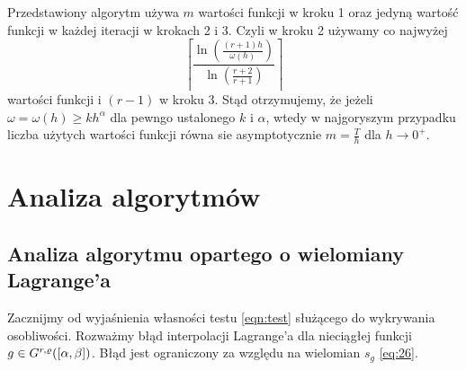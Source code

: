 \documentclass[oik, pdftex, robocza, man]{mgrwms}
\begin{document}
    Przedstawiony algorytm używa $m$ wartości funkcji w kroku 1 oraz jedyną wartość funkcji w każdej iteracji w krokach 2 i 3. Czyli w kroku 2 używamy co najwyżej
    \begin{equation*}
        \left\lceil\frac{\ln \left(\frac{(r+1) h}{\omega(h)}\right)}{\ln \left(\frac{r+2}{r+1}\right)}\right\rceil
    \end{equation*}
    wartości funkcji i $(r-1)$ w kroku 3.
    Stąd otrzymujemy, że jeżeli $\omega = \omega(h) \geq kh^{\alpha}$ dla pewngo ustalonego $k$ i $\alpha$, wtedy w najgoryszym przypadku liczba użytych wartości funkcji równa sie asymptotycznie $m = \frac{T}{h}$ dla $h \rightarrow 0^{+}$.


\mgrclosechapter


\chapter{Analiza algorytmów} \label{rozdzial_analiza_alg}


\section{Analiza algorytmu opartego o wielomiany Lagrange'a}


    Zacznijmy od wyjaśnienia własności testu \eqref{eqn:test} służącego do wykrywania osobliwości. Rozważmy błąd interpolacji Lagrange'a dla nieciągłej funkcji $g \in G^{r,\varrho}([\alpha,\beta])$. Błąd jest ograniczony za względu na wielomian $s_{g}$ \eqref{eq:26}.
\end{document}
